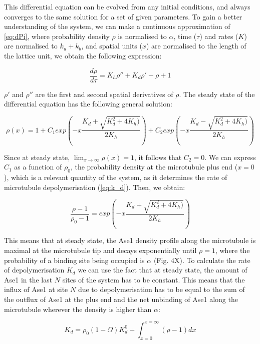 \documentclass{article}
\begin{document}
This differential equation can be evolved from any initial conditions, and always converges to the same solution for a set of given parameters. To gain a better understanding of the system, we can make a continuous approximation of \autoref{eq:dPi}, where probability density $\rho$ is normalised to $\alpha$, time ($\tau$) and rates ($K$) are normalised to $k_u + k_b$, and spatial units ($x$) are normalised to the length of the lattice unit, we obtain the following expression:

\begin{equation}
\frac{d\rho}{d\tau} = K_h\rho'' + K_d\rho'-\rho+1
\end{equation}

$\rho'$ and $\rho''$ are the first and second spatial derivatives of $\rho$. The steady state of the differential equation has the following general solution:

\begin{equation}
\rho(x) = 1+C_1exp\left(-x\frac{K_d + \sqrt{K_d^2 + 4 K_h)}}{2K_h}\right) + C_2exp\left(-x\frac{K_d - \sqrt{K_d^2 + 4 K_h)}}{2K_h}\right)
\end{equation}

Since at steady state, $\lim_{x\to\infty}\rho(x)=1$, it follows that $C_2=0$. We can express $C_1$ as a function of $\rho_0$, the probability density at the microtubule plus end ($x=0$), which is a relevant quantity of the system, as it determines the rate of microtubule depolymerisation (\autoref{eq:k_d}). Then, we obtain:

\begin{equation}
\label{eq:exponential}
\frac{\rho-1}{\rho_0-1}=exp\left(-x\frac{K_d + \sqrt{K_d^2 + 4 K_h)}}{2K_h}\right)
\end{equation}

This means that at steady state, the Ase1 density profile along the microtubule is maximal at the microtubule tip and decays exponentially until $\rho=1$, where the probability of a binding site being occupied is $\alpha$ (Fig. 4X). To calculate the rate of depolymerisation $K_d$ we can use the fact that at steady state, the amount of Ase1 in the last $N$ sites of the system has to be constant. This means that the influx of Ase1 at site $N$ due to depolymerisation has to be equal to the sum of the outflux of Ase1 at the plus end and the net unbinding of Ase1 along the microtubule wherever the density is higher than $\alpha$:

\begin{equation}
\label{eq:balance}
K_d = \rho_0(1-\Omega)K_d^0 + \int_{x=0}^{x=\infty}\left(\rho-1\right)dx
\end{equation}
\end{document}
